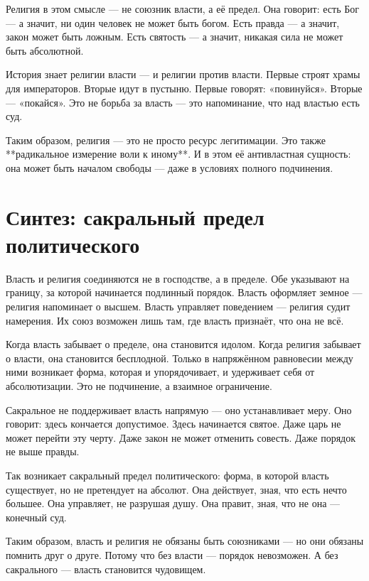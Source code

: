 Религия в этом смысле — не союзник власти, а её предел. Она говорит: есть Бог — а значит, ни один человек не может быть богом. Есть правда — а значит, закон может быть ложным. Есть святость — а значит, никакая сила не может быть абсолютной.

История знает религии власти — и религии против власти. Первые строят храмы для императоров. Вторые идут в пустыню. Первые говорят: «повинуйся». Вторые — «покайся». Это не борьба за власть — это напоминание, что над властью есть суд.

Таким образом, религия — это не просто ресурс легитимации. Это также **радикальное измерение воли к иному**. И в этом её антивластная сущность: она может быть началом свободы — даже в условиях полного подчинения.

\section{Синтез: сакральный предел политического}

Власть и религия соединяются не в господстве, а в пределе. Обе указывают на границу, за которой начинается подлинный порядок. Власть оформляет земное — религия напоминает о высшем. Власть управляет поведением — религия судит намерения. Их союз возможен лишь там, где власть признаёт, что она не всё.

Когда власть забывает о пределе, она становится идолом. Когда религия забывает о власти, она становится бесплодной. Только в напряжённом равновесии между ними возникает форма, которая и упорядочивает, и удерживает себя от абсолютизации. Это не подчинение, а взаимное ограничение.

Сакральное не поддерживает власть напрямую — оно устанавливает меру. Оно говорит: здесь кончается допустимое. Здесь начинается святое. Даже царь не может перейти эту черту. Даже закон не может отменить совесть. Даже порядок не выше правды.

Так возникает сакральный предел политического: форма, в которой власть существует, но не претендует на абсолют. Она действует, зная, что есть нечто большее. Она управляет, не разрушая душу. Она правит, зная, что не она — конечный суд.

Таким образом, власть и религия не обязаны быть союзниками — но они обязаны помнить друг о друге. Потому что без власти — порядок невозможен. А без сакрального — власть становится чудовищем.
